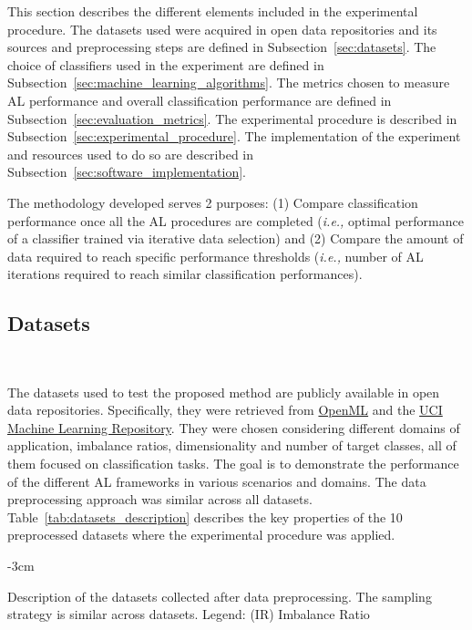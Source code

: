 \documentclass[preprint, 12pt]{elsarticle}
\begin{document}
This section describes the different elements included in the experimental
procedure. The datasets used were acquired in open data repositories and its
sources and preprocessing steps are defined in Subsection~\ref{sec:datasets}.
The choice of classifiers used in the experiment are defined in
Subsection~\ref{sec:machine_learning_algorithms}. The metrics chosen to
measure AL performance and overall classification performance are defined in
Subsection~\ref{sec:evaluation_metrics}. The experimental procedure is
described in Subsection~\ref{sec:experimental_procedure}. The implementation
of the experiment and resources used to do so are described in
Subsection~\ref{sec:software_implementation}.

The methodology developed serves 2 purposes: (1) Compare classification
performance once all the AL procedures are completed (\textit{i.e.,} optimal
performance of a classifier trained via iterative data selection) and (2)
Compare the amount of data required to reach specific performance thresholds
(\textit{i.e.,} number of AL iterations required to reach similar
classification performances).
 
\subsection{Datasets}~\label{sec:datasets}

The datasets used to test the proposed method are publicly available in open
data repositories. Specifically, they were retrieved from
\href{https://www.openml.org/}{OpenML} and the
\href{https://archive.ics.uci.edu/}{UCI Machine Learning Repository}. They
were chosen considering different domains of application, imbalance ratios,
dimensionality and number of target classes, all of them focused on
classification tasks. The goal is to demonstrate the performance of the
different AL frameworks in various scenarios and domains. The data
preprocessing approach was similar across all datasets.
Table~\ref{tab:datasets_description} describes the key properties of the 10
preprocessed datasets where the experimental procedure was applied. 
 
\begin{table}[H]
    \centering
    \addtolength{\leftskip} {-3cm}
    \addtolength{\rightskip}{-3cm}
    \caption{\label{tab:datasets_description}
        Description of the datasets collected after data preprocessing. The
        sampling strategy is similar across datasets. Legend: (IR) Imbalance
        Ratio
    }
\end{table}
\end{document}

